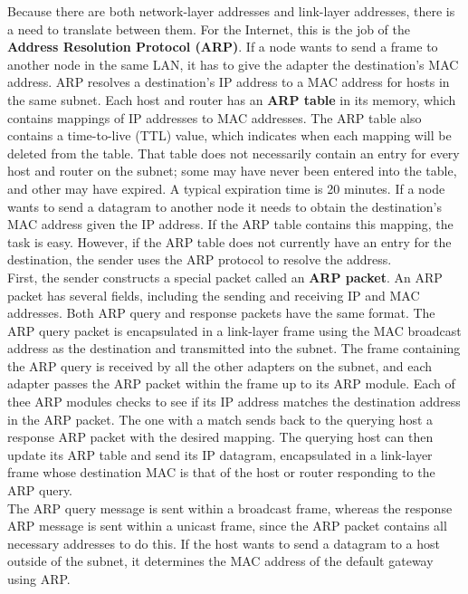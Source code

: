 Because there are both network-layer addresses and link-layer addresses, there is a need to translate between them. For the Internet, this is the job of the \textbf{Address Resolution Protocol (ARP)}. If a node wants to send a frame to another node in the same LAN, it has to give the adapter the destination's MAC address. ARP resolves a destination's IP address to a MAC address for hosts in the same subnet. Each host and router has an \textbf{ARP table} in its memory, which contains mappings of IP addresses to MAC addresses. The ARP table also contains a time-to-live (TTL) value, which indicates when each mapping will be deleted from the table. That table does not necessarily contain an entry for every host and router on the subnet; some may have never been entered into the table, and other may have expired. A typical expiration time is 20 minutes. If a node wants to send a datagram to another node it needs to obtain the destination's MAC address given the IP address. If the ARP table contains this mapping, the task is easy. However, if the ARP table does not currently have an entry for the destination, the sender uses the ARP protocol to resolve the address.\\
First, the sender constructs a special packet called an \textbf{ARP packet}. An ARP packet has several fields, including the sending and receiving IP and MAC addresses. Both ARP query and response packets have the same format. The ARP query packet is encapsulated in a link-layer frame using the MAC broadcast address as the destination and transmitted into the subnet. The frame containing the ARP query is received by all the other adapters on the subnet, and each adapter passes the ARP packet within the frame up to its ARP module. Each of thee ARP modules checks to see if its IP address matches the destination address in the ARP packet. The one with a match sends back to the querying host a response ARP packet with the desired mapping. The querying host can then update its ARP table and send its IP datagram, encapsulated in a link-layer frame whose destination MAC is that of the host or router responding to the ARP query.\\
The ARP query message is sent within a broadcast frame, whereas the response ARP message is sent within a unicast frame, since the ARP packet contains all necessary addresses to do this. If the host wants to send a datagram to a host outside of the subnet, it determines the MAC address of the default gateway using ARP.

